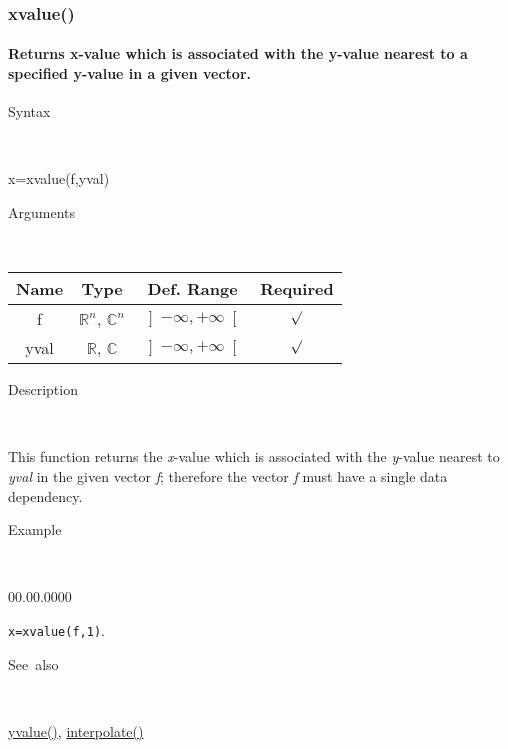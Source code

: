 \newpage
\subsubsection*{\hypertarget{xvalue}{}{\Large xvalue()}}


\paragraph{\label{par:xvalue}Returns x-value which is associated with the y-value
nearest to a specified y-value in a given vector.}

\begin{description}
\item [Syntax]~
\end{description}
x=xvalue(f,yval)

\begin{description}
\item [Arguments]~
\end{description}
\begin{tabular}{|c|c|c|c|}
\hline 
Name&
Type&
Def. Range&
Required\tabularnewline
\hline
\hline 
f&
$\mathbb{R}^{n}$, $\mathbb{C}^{n}$&
$\left]-\infty,+\infty\right[$&
$\surd$\tabularnewline
\hline
yval&
$\mathbb{R}$, $\mathbb{C}$&
$\left]-\infty,+\infty\right[$&
$\surd$\tabularnewline
\hline
\end{tabular}

\begin{description}
\item [Description]~
\end{description}
This function returns the \textit{x}-value which is associated with
the \textit{y}-value nearest to \textit{yval} in the given vector
\textit{f}; therefore the vector \textit{f} must have a single data
dependency.

\begin{description}
\item [Example]~
\end{description}
\begin{lyxlist}{00.00.0000}
\item [\texttt{x=xvalue(f,1)}.]~
\end{lyxlist}
\begin{description}
\item [See~also]~
\end{description}
\textcolor{blue}{\hyperlink{yvalue}{yvalue()}}\textcolor{black}{,}
\textcolor{blue}{\hyperlink{interpolate}{interpolate()}}


